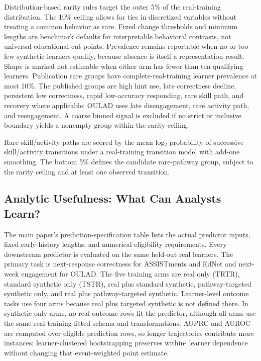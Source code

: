 \documentclass[10pt]{article}
\begin{document}
Distribution-based rarity rules target the outer 5\% of the real-training distribution. The
10\% ceiling allows for ties in discretized variables without treating a common
behavior as rare. Fixed change thresholds and minimum lengths are benchmark
defaults for interpretable behavioral contrasts, not universal educational cut
points. Prevalence remains reportable when no or too few synthetic learners qualify,
because absence is itself a representation result.  Shape is marked not estimable
when either arm has fewer than ten qualifying learners.  Publication rare
groups have complete-real-training learner prevalence at most 10\%.  The
published groups are high hint use, late correctness decline, persistent low
correctness, rapid low-accuracy responding, rare skill path, and recovery where applicable; OULAD uses late
disengagement, rare activity path, and reengagement.  A coarse binned signal is
excluded if no strict or inclusive boundary yields a nonempty group within the
rarity ceiling.

Rare skill/activity paths are scored by the mean log$_2$ probability of successive skill/activity transitions under a real-training transition model with add-one smoothing. The bottom 5\% defines the candidate rare-pathway group, subject to the rarity ceiling and at least one observed transition.

\subsection{Analytic Usefulness: What Can Analysts Learn?}

The main paper's prediction-specification table lists the actual predictor inputs, fixed early-history lengths, and numerical eligibility requirements. Every downstream predictor is evaluated on the same held-out real learners.
The primary task is next-response correctness for ASSISTments and EdNet and
next-week engagement for OULAD.  The five training arms are real only (TRTR),
standard synthetic only (TSTR), real plus standard synthetic, pathway-targeted
synthetic only, and real plus pathway-targeted synthetic.  Learner-level outcome
tasks use four arms because real plus targeted synthetic is not defined there.
In synthetic-only arms, no real outcome rows fit the predictor, although all
arms use the same real-training-fitted schema and transformations. AUPRC and
AUROC are computed over eligible prediction rows, so longer trajectories
contribute more instances; learner-clustered bootstrapping preserves within-
learner dependence without changing that event-weighted point estimate.
\end{document}
